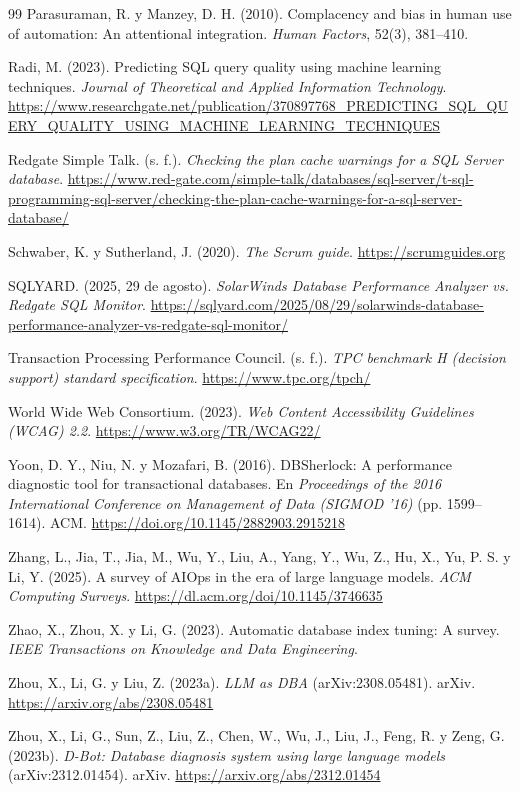 \documentclass[12pt,a4paper]{article}
\begin{document}
\begin{thebibliography}{99}
 Parasuraman, R. y Manzey, D. H. (2010). Complacency and bias in human use of automation: An attentional integration. \textit{Human Factors}, 52(3), 381--410.

 Radi, M. (2023). Predicting SQL query quality using machine learning techniques. \textit{Journal of Theoretical and Applied Information Technology}. \url{https://www.researchgate.net/publication/370897768_PREDICTING_SQL_QUERY_QUALITY_USING_MACHINE_LEARNING_TECHNIQUES}

 Redgate Simple Talk. (s. f.). \textit{Checking the plan cache warnings for a SQL Server database}. \url{https://www.red-gate.com/simple-talk/databases/sql-server/t-sql-programming-sql-server/checking-the-plan-cache-warnings-for-a-sql-server-database/}

 Schwaber, K. y Sutherland, J. (2020). \textit{The Scrum guide}. \url{https://scrumguides.org}

 SQLYARD. (2025, 29 de agosto). \textit{SolarWinds Database Performance Analyzer vs. Redgate SQL Monitor}. \url{https://sqlyard.com/2025/08/29/solarwinds-database-performance-analyzer-vs-redgate-sql-monitor/}

 Transaction Processing Performance Council. (s. f.). \textit{TPC benchmark H (decision support) standard specification}. \url{https://www.tpc.org/tpch/}

 World Wide Web Consortium. (2023). \textit{Web Content Accessibility Guidelines (WCAG) 2.2}. \url{https://www.w3.org/TR/WCAG22/}

 Yoon, D. Y., Niu, N. y Mozafari, B. (2016). DBSherlock: A performance diagnostic tool for transactional databases. En \textit{Proceedings of the 2016 International Conference on Management of Data (SIGMOD '16)} (pp. 1599--1614). ACM. \url{https://doi.org/10.1145/2882903.2915218}

 Zhang, L., Jia, T., Jia, M., Wu, Y., Liu, A., Yang, Y., Wu, Z., Hu, X., Yu, P. S. y Li, Y. (2025). A survey of AIOps in the era of large language models. \textit{ACM Computing Surveys}. \url{https://dl.acm.org/doi/10.1145/3746635}

 Zhao, X., Zhou, X. y Li, G. (2023). Automatic database index tuning: A survey. \textit{IEEE Transactions on Knowledge and Data Engineering}.

 Zhou, X., Li, G. y Liu, Z. (2023a). \textit{LLM as DBA} (arXiv:2308.05481). arXiv. \url{https://arxiv.org/abs/2308.05481}

 Zhou, X., Li, G., Sun, Z., Liu, Z., Chen, W., Wu, J., Liu, J., Feng, R. y Zeng, G. (2023b). \textit{D-Bot: Database diagnosis system using large language models} (arXiv:2312.01454). arXiv. \url{https://arxiv.org/abs/2312.01454}

\end{thebibliography}
\end{document}
